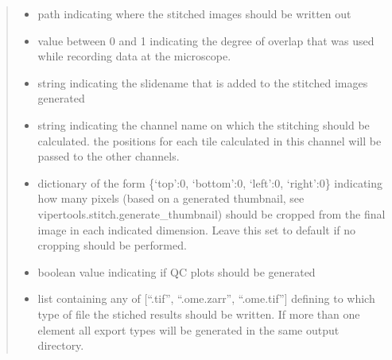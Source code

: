 \documentclass[a4paper,10pt,english,openany,oneside]{sphinxmanual}
\begin{document}
\begin{fulllineitems}
\begin{quote}
\begin{description}
\begin{itemize}
\item {} 
\sphinxAtStartPar
{} \textendash{} path indicating where the stitched images should be written out

\item {} 
\sphinxAtStartPar
{} \textendash{} value between 0 and 1 indicating the degree of overlap that was used while recording data at the microscope.

\item {} 
\sphinxAtStartPar
{} \textendash{} string indicating the slidename that is added to the stitched images generated

\item {} 
\sphinxAtStartPar
{} \textendash{} string indicating the channel name on which the stitching should be calculated. the positions for each tile calculated in this channel will be
passed to the other channels.

\item {} 
\sphinxAtStartPar
{} \textendash{} dictionary of the form \{‘top’:0, ‘bottom’:0, ‘left’:0, ‘right’:0\} indicating how many pixels (based on a generated thumbnail,
see vipertools.stitch.generate\_thumbnail) should be cropped from the final image in each indicated dimension. Leave this set to default
if no cropping should be performed.

\item {} 
\sphinxAtStartPar
{} \textendash{} boolean value indicating if QC plots should be generated

\item {} 
\sphinxAtStartPar
{} \textendash{} list containing any of {[}“.tif”, “.ome.zarr”, “.ome.tif”{]} defining to which type of file the stiched results should be written. If more than one
element all export types will be generated in the same output directory.

\end{itemize}

\end{description}\end{quote}

\end{fulllineitems}

\end{document}
